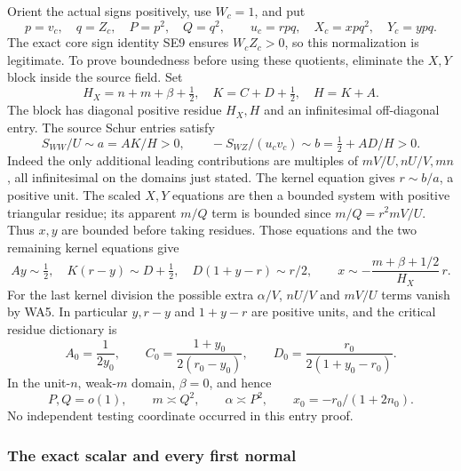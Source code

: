 Orient the actual signs positively, use \(W_c=1\), and put
\[
 p=v_c,\quad q=Z_c,\quad P=p^2,\quad Q=q^2,\qquad
 u_c=rpq,\quad X_c=xpq^2,\quad Y_c=ypq.
 \tag{WA7}
\]
The exact core sign identity SE9 ensures \(W_cZ_c>0\), so this
normalization is legitimate. To prove boundedness before using these
quotients, eliminate the \(X,Y\) block inside the source field. Set
\[
 H_X=n+m+\beta+\tfrac12,\quad K=C+D+\tfrac12,\quad H=K+A .
\]
The block has diagonal positive residue \(H_X,H\) and an infinitesimal
off-diagonal entry. The source Schur entries satisfy
\[
 S_{WW}/U\sim a=AK/H>0,\qquad
 -S_{WZ}/(u_cv_c)\sim b=\tfrac12+AD/H>0.
 \tag{WA8}
\]
Indeed the only additional leading contributions are multiples of
\(mV/U,nU/V,mn\), all infinitesimal on the domains just stated.
The kernel equation gives \(r\sim b/a\), a positive unit. The scaled
\(X,Y\) equations are then a bounded system with positive triangular
residue; its apparent \(m/Q\) term is bounded since
\(m/Q=r^2mV/U\). Thus \(x,y\) are bounded before taking residues.
Those equations and the two remaining kernel equations give
\[
 Ay\sim\tfrac12,\quad
 K(r-y)\sim D+\tfrac12,\quad
 D(1+y-r)\sim r/2,\qquad
 x\sim-\frac{m+\beta+1/2}{H_X}\,r.
 \tag{WA9}
\]
For the last kernel division the possible extra \(\alpha/V\),
\(nU/V\) and \(mV/U\) terms vanish by WA5. In particular \(y,r-y\)
and \(1+y-r\) are positive units, and the critical residue dictionary is
\[
 A_0=\frac1{2y_0},\qquad
 C_0=\frac{1+y_0}{2(r_0-y_0)},\qquad
 D_0=\frac{r_0}{2(1+y_0-r_0)}.
 \tag{WA10}
\]
In the unit-\(n\), weak-\(m\) domain, \(\beta=0\), and hence
\[
 P,Q=o(1),\qquad m\asymp Q^2,\qquad
 \alpha\asymp P^2,\qquad
 x_0=-r_0/(1+2n_0).
 \tag{WA11}
\]
No independent testing coordinate occurred in this entry proof.

\subsubsection*{The exact scalar and every first normal}

